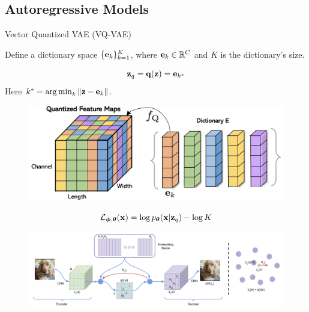 \documentclass{beamer}
\begin{document}
\subsection{Autoregressive Models}
\begin{frame}{Vector Quantized VAE (VQ-VAE)}

	Define a dictionary space $\{\mathbf{e}_k\}_{k=1}^K$, where $\mathbf{e}_k \in \mathbb{R}^C$ and $K$ is the dictionary’s size.
	\vspace{-0.5cm}
	\begin{minipage}[t]{0.45\columnwidth}
		\[
			\mathbf{z}_q = \mathbf{q} (\mathbf{z}) = \mathbf{e}_{k^*}
		\]
        Here $k^* = \operatorname*{arg\,min}_k \| \mathbf{z} - \mathbf{e}_k \|$.
	\end{minipage}%
	\begin{minipage}[t]{0.55\columnwidth}
		\vspace{-0.5cm}
		\begin{figure}
			\includegraphics[width=\linewidth]{figs/fqgan_cnn}
		\end{figure}
	\end{minipage}	
	\vspace{0.5cm}	
    \eqpause
	\[
		\mathcal{L}_{\boldsymbol{\phi}, \boldsymbol{\theta}}(\mathbf{x})  =  \log p_{\boldsymbol{\theta}}(\mathbf{x}| \mathbf{z}_q) - \log K
	\]
	\vspace{-0.3cm}
	\begin{figure}
		\centering
		\includegraphics[width=\linewidth]{figs/vqvae}
	\end{figure}
\end{frame}
\end{document}
